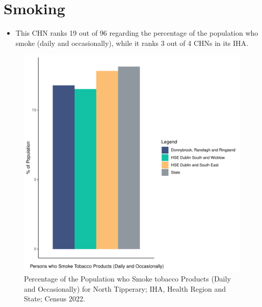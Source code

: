 \documentclass{article}
\begin{document}
\pagebreak

\section{Smoking}\label{sect:Smoking}
\begin{itemize}
\item This CHN ranks  19 out of 96 regarding the percentage of the population who smoke (daily and occasionally), while it ranks   3 out of 4 CHNs in its IHA.
\end{itemize}
\begin{figure}[H]
	\centering
	\includegraphics[width = 120mm]{../figures/SmokingED.pdf}
	\caption{Percentage of the Population who Smoke tobacco Products (Daily and Occasionally) for North Tipperary; IHA, Health Region and State; Census 2022.}
	\label{fig:2ae19629-1a6a-13a3-e055-000000000001}
	\end{figure}
	
\end{document}
